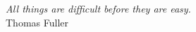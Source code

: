 \vspace*{3cm}

\begin{flushright}{
		\slshape All things are difficult before they are easy.} \\ \medskip Thomas Fuller
\end{flushright}

\begin{center}
\end{center}


%
